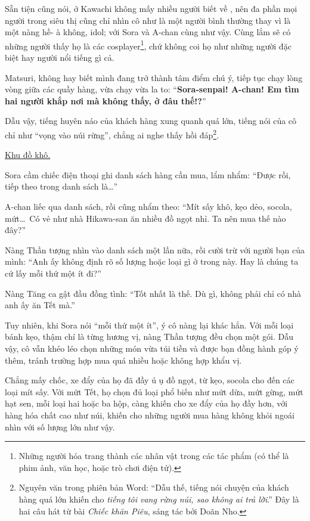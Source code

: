 \documentclass[../main.tex]{subfiles}
\begin{document}
Sẵn tiện cũng nói, ở Kawachi không mấy nhiều người biết về \hll, nên đa phần mọi người trong siêu thị cũng chỉ nhìn cô như là một người bình thường thay vì là một nàng hề- à không, idol; với Sora và A-chan cùng như vậy. Cùng lắm sẽ có những người thấy họ là các cosplayer\footnote{Những người hóa trang thành các nhân vật trong các tác phẩm (có thể là phim ảnh, văn học, hoặc trò chơi điện tử).}, chứ không coi họ như những người đặc biệt hay người nổi tiếng gì cả.

Matsuri, không hay biết mình đang trở thành tâm điểm chú ý, tiếp tục chạy lòng vòng giữa các quầy hàng, vừa chạy vừa la to: ``\textbf{Sora-senpai! A-chan! Em tìm hai người khắp nơi mà không thấy, ở đâu thế!?}''

Dẫu vậy, tiếng huyên náo của khách hàng xung quanh quá lớn, tiếng nói của cô chỉ như ``vọng vào núi rừng'', chẳng ai nghe thấy hồi đáp\footnote{Nguyên văn trong phiên bản Word: ``Dẫu thế, tiếng nói chuyện của khách hàng quá lớn khiến cho \textit{tiếng tôi vang rừng núi, sao không ai trả lời}.'' Đây là hai câu hát từ bài \textit{Chiếc khăn Piêu}, sáng tác bởi Doãn Nho.}.

\begin{center}
    \uline{Khu đồ khô.}
\end{center}

Sora cầm chiếc điện thoại ghi danh sách hàng cần mua, lẩm nhẩm: ``Được rồi, tiếp theo trong danh sách là\dots''

A-chan liếc qua danh sách, rồi cũng nhẩm theo: ``Mít sấy khô, kẹo dẻo, socola, mứt\dots\ Có vẻ như nhà Hikawa-san ăn nhiều đồ ngọt nhỉ. Ta nên mua thế nào đây?''

Nàng Thần tượng nhìn vào danh sách một lần nữa, rồi cười trừ với người bạn của mình: ``Anh ấy không định rõ số lượng hoặc loại gì ở trong này. Hay là chúng ta cứ lấy mỗi thứ một ít đi?''

Nàng Tăng ca gật đầu đồng tình: ``Tốt nhất là thế. Dù gì, không phải chỉ có nhà anh ấy ăn Tết mà.''

Tuy nhiên, khi Sora nói ``mỗi thứ một ít'', ý cô nàng lại khác hẳn. Với mỗi loại bánh kẹo, thậm chí là từng hương vị, nàng Thần tượng đều chọn một gói. Dẫu vậy, cô vẫn khéo léo chọn những món vừa túi tiền và được bạn đồng hành góp ý thêm, tránh trường hợp mua quá nhiều hoặc không hợp khẩu vị.

Chẳng mấy chốc, xe đẩy của họ đã đầy ú ụ đồ ngọt, từ kẹo, socola cho đến các loại mít sấy. Với mứt Tết, họ chọn đủ loại phổ biến như mứt dừa, mứt gừng, mứt hạt sen, mỗi loại hai hoặc ba hộp, càng khiến cho xe đẩy của họ đầy hơn, với hàng hóa chất cao như núi, khiến cho những người mua hàng không khỏi ngoái nhìn với số lượng lớn như vậy.
\end{document}
